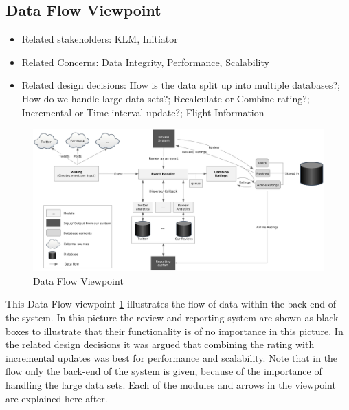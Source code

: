 % 

\subsection{Data Flow Viewpoint}

\begin{itemize}
\item Related stakeholders: KLM, Initiator
\item Related Concerns: Data Integrity, Performance, Scalability
\item Related design decisions: How is the data split up into multiple databases?; How do we handle large data-sets?; Recalculate or Combine rating?; Incremental or Time-interval update?; Flight-Information
\end{itemize}

\newpage
\begin{landscape}
\begin{figure}
\includegraphics[width=600px]{DataFlowGraph}
\caption{Data Flow Viewpoint}
\label{fig:Data Flow}
\end{figure}
\end{landscape}

This Data Flow viewpoint \ref{fig:Data Flow} illustrates the flow of data within the back-end of the system. In this picture the review and reporting system are shown as black boxes to illustrate that their functionality is of no importance in this picture.
In the related design decisions it was argued that combining the rating with incremental updates was best for performance and scalability. Note that in the flow only the back-end of the system is given, because of the importance of handling the large data sets. Each of the modules and arrows in the viewpoint are explained here after.

